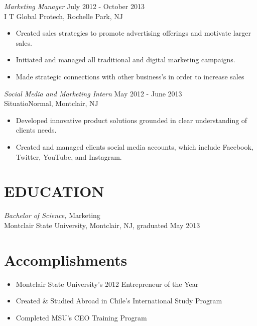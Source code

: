 \documentclass[margin]{res}
\begin{document}
\begin{resume}
                {\sl Marketing Manager} \hfill July 2012 - October 2013 \\
                I T Global Protech, Rochelle Park, NJ
                 \begin{itemize}  \itemsep -2pt %
                 \item Created sales strategies to promote advertising offerings and motivate larger sales.
                 \item Initiated and
managed all traditional and digital marketing campaigns.
                 \item Made strategic connections with other
business's in order to increase sales
                 \end{itemize}
                 
               {\sl Social Media and Marketing Intern} \hfill            May 2012 - June 2013 \\
                SituatioNormal, Montclair, NJ
                 \begin{itemize}  \itemsep -2pt %
                 \item Developed innovative product solutions grounded in clear
understanding of clients needs.
                 \item Created and managed clients social media accounts, which include
Facebook, Twitter, YouTube, and Instagram.
                 \end{itemize} 
 
\section{EDUCATION} {\sl Bachelor of Science,} Marketing \\
                Montclair State University, Montclair, NJ, 
                graduated May 2013 \\
\section{Accomplishments}  
	\begin{itemize}
		\item Montclair State University's 2012 Entrepreneur of the Year
		\item Created \& Studied Abroad in Chile's International Study Program
					                 \item	Completed MSU's CEO Training Program
					                
					                 
	\end{itemize}

\end{resume}
\end{document}
